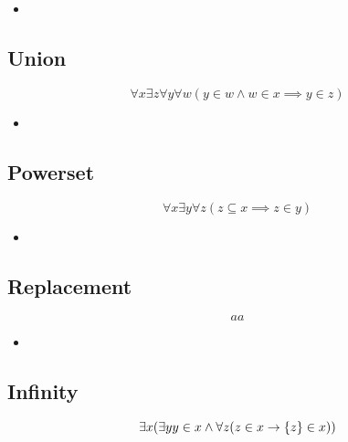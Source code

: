 \begin{itemize}
	
	\item 
	
\end{itemize}

\subsection{Union}
\begin{equation*}
\forall x \exists z \forall y \forall w (y \in w \land w \in x \implies y \in z)
\end{equation*}


\begin{itemize}
	
	\item 
	
\end{itemize}

\subsection{Powerset}
\begin{equation*}
\forall x \exists y \forall z (z \subseteq x \implies z \in y)
\end{equation*}

\begin{itemize}
	
	\item 
	
\end{itemize}


\subsection{Replacement}
\begin{equation*}
aa
\end{equation*}

\begin{itemize}
	
	\item 
	
\end{itemize}

\subsection{Infinity}
\begin{equation*}
\exists x (\exists y y \in x \land \forall z (z \in x \rightarrow \left\lbrace z \right\rbrace \in x))
\end{equation*}

